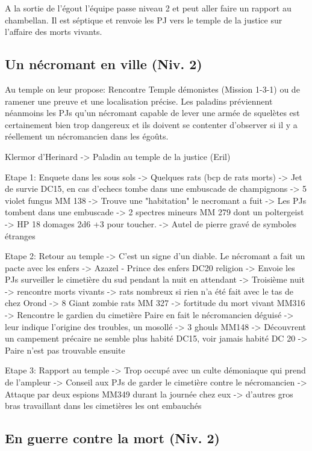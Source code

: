 A la sortie de l'égout l'équipe passe niveau 2 et peut aller faire un rapport au chambellan. Il est
séptique et renvoie les PJ vers le temple de la justice sur l'affaire des morts vivants.

\subsection{Un nécromant en ville (Niv. 2)}

Au temple on leur propose: Rencontre Temple démonistes (Mission 1-3-1) ou de ramener une preuve et une 
localisation précise. Les paladins préviennent néanmoins les PJs qu'un nécromant capable de lever une
armée de squelètes est certainement bien trop dangereux et ils doivent se contenter d'observer si il
y a réellement un nécromancien dans les égoûts.

Klermor d'Herinard -> Paladin au temple de la justice (Eril)

Etape 1: Enquete dans les sous sols 
 -> Quelques rats (bcp de rats morts)
 -> Jet de survie DC15, en cas d'echecs tombe dans une embuscade de champignons -> 5 violet fungus MM 138
 -> Trouve une "habitation" le necromant a fuit
 -> Les PJs tombent dans une embuscade -> 2 spectres mineurs MM 279 dont un poltergeist -> HP 18 domages 2d6 +3 pour toucher.
 -> Autel de pierre gravé de symboles étranges

Etape 2: Retour au temple
 -> C'est un signe d'un diable. Le nécromant a fait un pacte avec les enfers -> Azazel - Prince des enfers DC20 religion
 -> Envoie les PJs surveiller le cimetière du sud pendant la nuit en attendant
 -> Troisième nuit -> rencontre morts vivants -> rats nombreux si rien n'a été fait avec le tas de chez Orond -> 8 Giant zombie rats MM 327 -> fortitude du mort vivant MM316
 -> Rencontre le gardien du cimetière Paire en fait le nécromancien déguisé -> leur indique l'origine des troubles, un mosollé -> 3 ghouls MM148
 -> Découvrent un campement précaire ne semble plus habité DC15, voir jamais habité DC 20 -> Paire n'est pas trouvable ensuite

Etape 3: Rapport au temple
 -> Trop occupé avec un culte démoniaque qui prend de l'ampleur
 -> Conseil aux PJs de garder le cimetière contre le nécromancien
 -> Attaque par deux espions MM349 durant la journée chez eux -> d'autres gros bras travaillant dans les cimetières les ont embauchés


\subsection{En guerre contre la mort (Niv. 2)}

